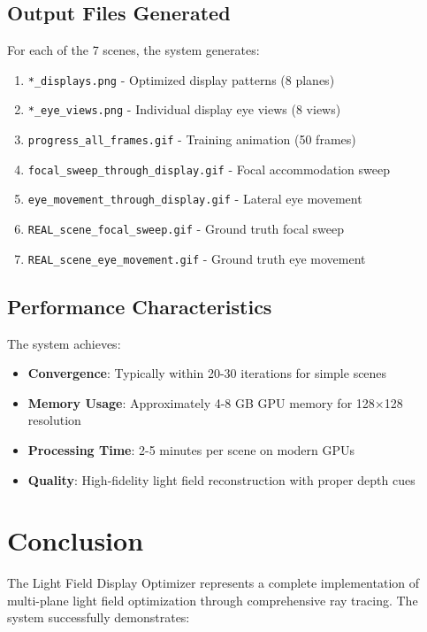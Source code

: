 \documentclass[12pt,a4paper]{article}
\begin{document}
\subsection{Output Files Generated}

For each of the 7 scenes, the system generates:

\begin{enumerate}
    \item \texttt{*\_displays.png} - Optimized display patterns (8 planes)
    \item \texttt{*\_eye\_views.png} - Individual display eye views (8 views) 
    \item \texttt{progress\_all\_frames.gif} - Training animation (50 frames)
    \item \texttt{focal\_sweep\_through\_display.gif} - Focal accommodation sweep
    \item \texttt{eye\_movement\_through\_display.gif} - Lateral eye movement
    \item \texttt{REAL\_scene\_focal\_sweep.gif} - Ground truth focal sweep
    \item \texttt{REAL\_scene\_eye\_movement.gif} - Ground truth eye movement
\end{enumerate}

\subsection{Performance Characteristics}

The system achieves:
\begin{itemize}
    \item \textbf{Convergence}: Typically within 20-30 iterations for simple scenes
    \item \textbf{Memory Usage}: Approximately 4-8 GB GPU memory for 128×128 resolution
    \item \textbf{Processing Time}: 2-5 minutes per scene on modern GPUs
    \item \textbf{Quality}: High-fidelity light field reconstruction with proper depth cues
\end{itemize}

\section{Conclusion}

The Light Field Display Optimizer represents a complete implementation of multi-plane light field optimization through comprehensive ray tracing. The system successfully demonstrates:
\end{document}

